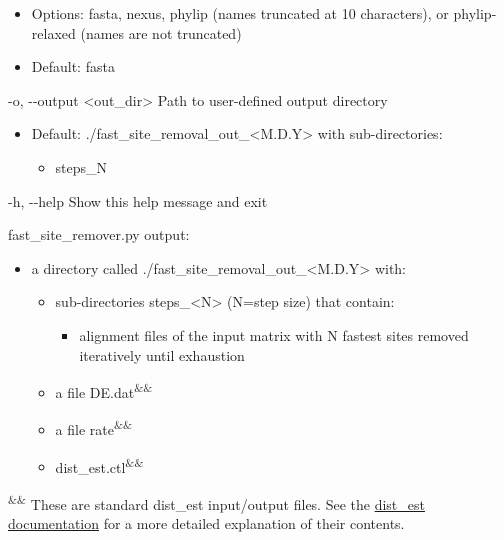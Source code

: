 \documentclass{article}
\begin{document}
\begin{description}
\begin{description}
\begin{description}
                    \begin{itemize}
                        \item Options: fasta, nexus, phylip (names truncated at 10 characters), or phylip-relaxed (names are not truncated)
                        \item Default: fasta
                    \end{itemize}
                    \item -o, -\/-output \hspace{0.2cm} <out\_dir> \hspace{0.2cm} Path to user-defined output directory
                    \begin{itemize}
                        \item Default: ./fast\_site\_removal\_out\_<M.D.Y> with sub-directories:
                        \begin{itemize}
                            \item steps\_N
                        \end{itemize}
                    \end{itemize}
                    \item -h, -\/-help \hspace{0.2cm} Show this help message and exit
                \end{description}
            \end{description}
            \vspace{0.2cm}
            \begin{description}
                \item fast\_site\_remover.py output:
                \begin{itemize}
                    \item a directory called ./fast\_site\_removal\_out\_<M.D.Y> with:
                    \begin{itemize}
                        \item sub-directories steps\_<N> (N=step size) that contain:
                        \begin{itemize}
                            \item alignment files of the input matrix with N fastest sites removed iteratively until exhaustion
                        \end{itemize}
                        \item a file DE.dat\textsuperscript{\&\&}
                        \item a file rate\textsuperscript{\&\&}
                        \item dist\_est.ctl\textsuperscript{\&\&}
                    \end{itemize}
                \end{itemize}
            \end{description}
           \textsuperscript{\&\&} These are standard dist\_est input/output files. See the \href{http://amoeba.msstate.edu/phylofisher/pdfs/distest.pdf}{dist\_est documentation} for a more detailed explanation of their contents.
        \end{description}
        
\end{document}
